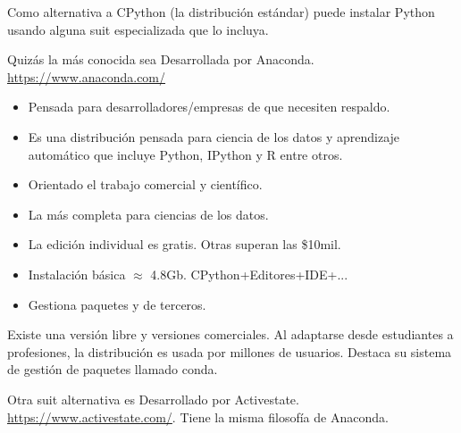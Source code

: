 	
Como alternativa a CPython (la distribución estándar) puede instalar Python usando alguna suit especializada que lo incluya.

Quizás la más conocida sea   Desarrollada por Anaconda. {\small \url{https://www.anaconda.com/}}
	\begin{itemize}
	\item Pensada para desarrolladores/empresas de  que necesiten respaldo.
	\item Es una distribución pensada para ciencia de los datos y aprendizaje automático que incluye Python, IPython y R entre otros.
	\item Orientado el trabajo comercial y científico. 
	\item La más completa para ciencias de los datos. 
	\item La edición individual es gratis. Otras superan las \$10mil.
	\item Instalación básica $\approx$ 4.8Gb. CPython+Editores+IDE+...
	\item Gestiona paquetes  y de terceros.
	\end{itemize} 
Existe una versión libre y versiones comerciales. Al adaptarse desde estudiantes a profesiones, la distribución es usada por millones de usuarios. Destaca su sistema de gestión de paquetes llamado conda.

Otra suit alternativa es  Desarrollado por Activestate. {\small \url{https://www.activestate.com/}}. Tiene la misma filosofía de Anaconda.

